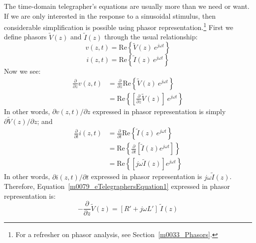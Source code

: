 The time-domain telegrapher's equations are usually more than we need or want.  If we are only interested in the response to a sinusoidal stimulus, then considerable simplification is possible using phasor representation.\footnote{For a refresher on phasor analysis, see Section~\ref{m0033_Phasors}.}  First we define phasors $\widetilde{V}(z)$ and $\widetilde{I}(z)$ through the usual relationship:
%
\begin{equation}
v(z,t) = \mbox{Re}\left\{\widetilde{V}(z) ~ e^{j\omega t} \right\}
\end{equation}
%
\begin{equation}
i(z,t) = \mbox{Re}\left\{\widetilde{I}(z) ~ e^{j\omega t} \right\}
\end{equation}  
%
Now we see:
%
\begin{equation}
\begin{split}
\frac{\partial}{\partial z} v(z,t) & = \frac{\partial}{\partial z} \mbox{Re}\left\{\widetilde{V}(z) ~ e^{j\omega t} \right\} \nonumber \\
                                   & = \mbox{Re}\left\{ \left[ \frac{\partial}{\partial z} \widetilde{V}(z) \right] ~ e^{j\omega t} \right\}
\end{split}
\end{equation}
%
In other words, $\partial v(z,t)/\partial z$ expressed in phasor representation is simply $\partial \widetilde{V}(z)/\partial z$; and 
%
\begin{equation}
\begin{split}
\frac{\partial}{\partial t} i(z,t) & = \frac{\partial}{\partial t} \mbox{Re}\left\{\widetilde{I}(z) ~ e^{j\omega t} \right\} \nonumber \\
                                   & = \mbox{Re}\left\{ \frac{\partial}{\partial t} \left[ \widetilde{I}(z) e^{j\omega t} \right] \right\} \nonumber \\
                                   & = \mbox{Re}\left\{ \left[ j\omega \widetilde{I}(z) \right] e^{j\omega t} \right\}
\end{split}
\end{equation}
%
In other words, $\partial i(z,t)/\partial t$ expressed in phasor representation is $j\omega \widetilde{I}(z)$.
Therefore, Equation~\ref{m0079_eTelegraphersEquation1} expressed in phasor representation is:
%
\begin{equation}
\boxed{
-\frac{\partial}{\partial z} \widetilde{V}(z) = \left[ R' + j\omega L' \right]~\widetilde{I}(z)
}
\label{m0079_eTelegraphersEquation1p}
\end{equation}
